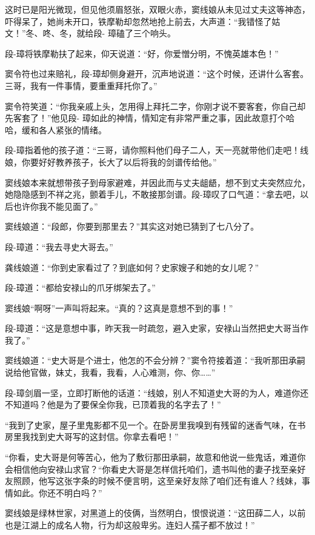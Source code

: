 \documentclass[12pt,oneside]{book}
\begin{document}
这时已是阳光微现，但见他须眉怒张，双眼火赤，窦线娘从未见过丈夫这等神态，吓得呆了，她尚未开口，铁摩勒却忽然地抢上前去，大声道：``我错怪了姑文！''冬、咚、冬，就给段-
璋磕了三个响头。

段-璋将铁摩勒扶了起来，仰天说道：``好，你爱憎分明，不愧英雄本色！''

窦令符也过来赔礼，段-璋却侧身避开，沉声地说道：``这个时候，还讲什么客套。三哥，我有一件事情，要重重拜托你了。''

窦令符笑道：``你我亲戚上头，怎用得上拜托二字，你刚才说不要客套，你自己却先客套了！''他见段-
璋如此的神情，情知定有非常严重之事，因此故意打个哈哈，缓和各人紧张的情绪。

段-璋指着他的孩子道：``三哥，请你照料他们母子二人，天一亮就带他们走吧！线娘，你要好好教养孩子，长大了以后将我的剑谱传给他。''

窦线娘本来就想带孩子到母家避难，并因此而与丈夫龃龉，想不到丈夫突然应允，她隐隐感到不祥之兆，颤着手儿，不敢接那剑谱。段-璋叹了口气道：``拿去吧，以后也许你我不能见面了。''

窦线娘道：``段郎，你要到那里去？''其实这对她已猜到了七八分了。

段-璋道：``我去寻史大哥去。''

龚线娘道：``你到史家看过了？到底如何？史家嫂子和她的女儿呢？''

段-璋道：``都给安禄山的爪牙绑架去了。''

窦线娘``啊呀''一声叫将起来。``真的？这真是意想不到的事！''

段-璋道：``这是意想中事，昨天我一时疏忽，避入史家，安禄山当然把史大哥当作我了。''

窦线娘道：``史大哥是个进士，他怎的不会分辨？''窦令符接着道：``我听那田承嗣说给他官做，妹丈，我看，我看，人心难测，你、你\ldots\ldots{}''

段-璋剑眉一坚，立即打断他的话道：``线娘，别人不知道史大哥的为人，难道你还不知道吗？他是为了要保全你我，已顶着我的名字去了！''

``我到了史家，屋子里鬼影都不见一个。在卧房里我嗅到有残留的迷香气味，在书房里我找到史大哥写的这封信。你拿去看吧！''

``你看，史大哥是何等苦心，他为了敷衍那田承嗣，故意和他说一些鬼话，难道你会相信他向安禄山求官？``你看史大哥是怎样信托咱们，遗书叫他的妻子找至亲好友照顾，他写这张字条的时候不便言明，这至亲好友除了咱们还有谁人？线妹，事情如此。你还不明白吗？''

窦线娘是绿林世家，对黑道上的伎俩，当然明白，恨恨说道：``这田薛二人，以前也是江湖上的成名人物，行为却这般卑劣。连妇人孺子都不放过！''
\end{document}
